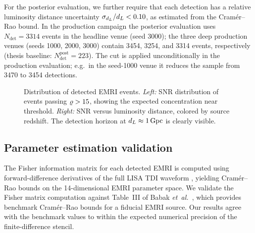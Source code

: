 For the posterior evaluation, we further require that each detection has a
relative luminosity distance uncertainty
$\sigma_{d_L}/d_L < 0.10$, as estimated from the Cram\'{e}r--Rao
bound. In the production campaign the posterior evaluation uses
$N_\mathrm{det} = 3314$ events in the headline venue (seed 3000); the
three deep production venues (seeds 1000, 2000, 3000) contain
3454, 3254, and 3314 events, respectively
(thesis baseline: $N_\mathrm{det}^\mathrm{post} = 223$). The cut is
applied unconditionally in the production evaluation; e.g.\ in the
seed-1000 venue it reduces the sample from 3470 to 3454 detections.

\begin{figure}[t]
  \centering
  \caption{Distribution of detected EMRI events. \emph{Left:} SNR
  distribution of events passing $\varrho > 15$, showing the expected
  concentration near threshold. \emph{Right:} SNR versus luminosity
  distance, colored by source redshift. The detection horizon at
  $d_L \approx 1\,\mathrm{Gpc}$ is clearly visible.}
  \label{fig:snr_distribution}
\end{figure}

\subsection{Parameter estimation validation}
\label{sec:pe_validation}

The Fisher information matrix for each detected EMRI is computed using
forward-difference derivatives of the full LISA TDI waveform
\cite{Vallisneri:2007ev}, yielding Cram\'{e}r--Rao bounds on the
14-dimensional EMRI parameter space. We validate the Fisher matrix
computation against Table~III of Babak
\emph{et~al.}~\cite{Babak:2017tow}, which provides benchmark
Cram\'{e}r--Rao bounds for a fiducial EMRI source. Our results agree with
the benchmark values to within the expected numerical precision of the
finite-difference stencil.

